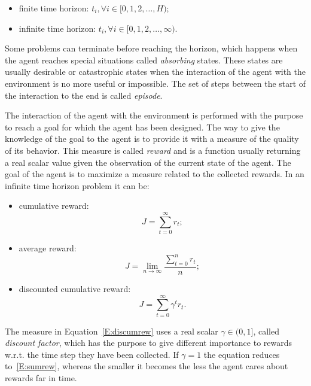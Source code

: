 \begin{itemize}
 \item finite time horizon: $t_i, \forall i \in [0, 1, 2, \dots, H)$;
 \item infinite time horizon: $t_i, \forall i \in [0, 1, 2, \dots, \infty)$.
\end{itemize}
Some problems can terminate before reaching the horizon, which happens when the agent reaches special situations called \textit{absorbing} states. These states are usually desirable or catastrophic states when the interaction of the agent with the environment is no more useful or impossible. The set of steps between the start of the interaction to the end is called \textit{episode}.

The interaction of the agent with the environment is performed with the purpose to reach a goal for which the agent has been designed. The way to give the knowledge of the goal to the agent is to provide it with a measure of the quality of its behavior. This measure is called \textit{reward} and is a function usually returning a real scalar value given the observation of the current state of the agent. The goal of the agent is to maximize a measure related to the collected rewards. In an infinite time horizon problem it can be:
\begin{itemize}
 \item cumulative reward:
 \begin{equation}\label{E:sumrew}
  J = \sum_{t=0}^\infty r_t;
 \end{equation}
\item average reward:
\begin{equation}
 J = \lim_{n\to\infty}\dfrac{\sum_{t=0}^n r_t}{n};
\end{equation}
\item discounted cumulative reward:
\begin{equation}\label{E:discumrew}
 J = \sum_{t=0}^\infty \gamma^t r_t.
\end{equation}
\end{itemize}
The measure in Equation~\ref{E:discumrew} uses a real scalar $\gamma \in (0, 1]$, called \textit{discount factor}, which has the purpose to give different importance to rewards w.r.t. the time step they have been collected. If $\gamma = 1$ the equation reduces to~\ref{E:sumrew}, whereas the smaller it becomes the less the agent cares about rewards far in time.

